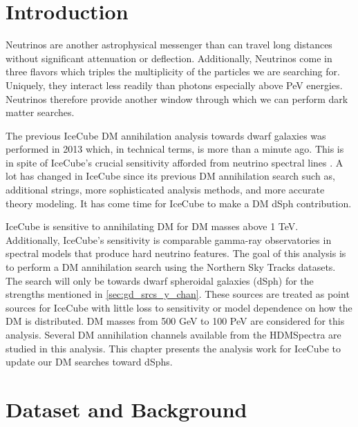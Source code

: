 \section{Introduction} \label{sec:icDM_intro}

Neutrinos are another astrophysical messenger than can travel long distances without significant attenuation or deflection.
Additionally, Neutrinos come in three flavors which triples the multiplicity of the particles we are searching for.
Uniquely, they interact less readily than photons especially above PeV energies.
Neutrinos therefore provide another window through which we can perform dark matter searches.

The previous IceCube DM annihilation analysis towards dwarf galaxies was performed in 2013 \cite{IC3_DM2013} which, in technical terms, is more than a minute ago.
This is in spite of IceCube's crucial sensitivity afforded from neutrino spectral lines \cite{IC3_DM_DanHooper}.
A lot has changed in IceCube since its previous DM annihilation search such as, additional strings, more sophisticated analysis methods, and more accurate theory modeling.
It has come time for IceCube to make a DM dSph contribution.

IceCube is sensitive to annihilating DM for DM masses above 1 TeV.
Additionally, IceCube's sensitivity is comparable gamma-ray observatories in spectral models that produce hard neutrino features.
The goal of this analysis is to perform a DM annihilation search using the Northern Sky Tracks datasets.
The search will only be towards dwarf spheroidal galaxies (dSph) for the strengths mentioned in \cref{sec:gd_srcs_y_chan}.
These sources are treated as point sources for IceCube with little loss to sensitivity or model dependence on how the DM is distributed.
DM masses from 500 GeV to 100 PeV are considered for this analysis.
Several DM annihilation channels available from the HDMSpectra \cite{HDMSpectra} are studied in this analysis.
This chapter presents the analysis work for IceCube to update our DM searches toward dSphs.

\section{Dataset and Background}\label{sec:icDM_databgd}

